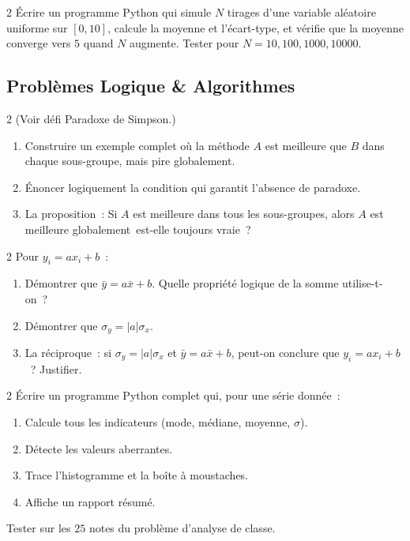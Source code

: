 \begin{bilan}
\begin{exo}{2}
\'Ecrire un programme Python qui simule $N$ tirages d'une variable al\'eatoire
uniforme sur $[0,10]$, calcule la moyenne et l'\'ecart-type, et v\'erifie
que la moyenne converge vers $5$ quand $N$ augmente.
Tester pour $N=10, 100, 1000, 10000$.
\end{exo}

\subsection*{Probl\`emes Logique \& Algorithmes}

\begin{probleme}{2}
(Voir d\'efi Paradoxe de Simpson.)
\begin{enumerate}
  \item Construire un exemple complet o\`u la m\'ethode $A$ est meilleure
        que $B$ dans chaque sous-groupe, mais pire globalement.
  \item \'Enoncer logiquement la condition qui garantit l'absence de paradoxe.
  \item La proposition~: \og Si $A$ est meilleure dans tous les sous-groupes,
        alors $A$ est meilleure globalement\fg\ est-elle toujours vraie~?
\end{enumerate}
\end{probleme}

\begin{probleme}{2}
Pour $y_i=ax_i+b$~:
\begin{enumerate}
  \item D\'emontrer que $\bar{y}=a\bar{x}+b$.
        Quelle propri\'et\'e logique de la somme utilise-t-on~?
  \item D\'emontrer que $\sigma_y=|a|\sigma_x$.
  \item La r\'eciproque~: si $\sigma_y=|a|\sigma_x$ et $\bar{y}=a\bar{x}+b$,
        peut-on conclure que $y_i=ax_i+b$~? Justifier.
\end{enumerate}
\end{probleme}

\begin{probleme}{2}
\'Ecrire un programme Python complet qui, pour une s\'erie donn\'ee~:
\begin{enumerate}
  \item Calcule tous les indicateurs (mode, m\'ediane, moyenne, $\sigma$).
  \item D\'etecte les valeurs aberrantes.
  \item Trace l'histogramme et la bo\^ite \`a moustaches.
  \item Affiche un rapport r\'esum\'e.
\end{enumerate}
Tester sur les $25$ notes du probl\`eme d'analyse de classe.
\end{probleme}


\end{bilan}
